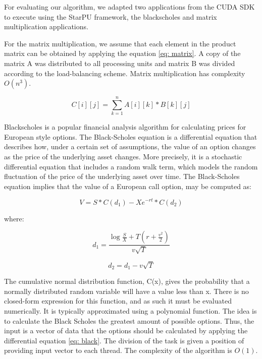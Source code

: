 \documentclass[journal]{IEEEtran}
\begin{document}
For evaluating our algorithm, we adapted two applications from the CUDA
SDK~\cite{cuda} to execute using the StarPU framework, the blackscholes and matrix
multiplication applications.

For the matrix multiplication, we assume that each element in the product matrix
can be obtained by applying the equation \ref{eq: matrix}. A copy of the matrix
A was distributed to all processing units and matrix B was divided according to
the load-balancing scheme. Matrix multiplication has complexity $O(n^3)$.

\begin{equation}
 C[i][j] = \sum_{k=1}^{n}  A[i][k] * B[k][j]
  \label{eq: matrix}
\end {equation}

Blackscholes is a popular financial analysis algorithm for calculating prices
for European style options. The Black-Scholes equation is a differential
equation that describes how, under a certain set of assumptions, the value of an
option changes as the price of the underlying asset changes. More precisely, it
is a stochastic differential equation that includes a random walk term, which
models the random fluctuation of the price of the underlying asset over time.
The Black-Scholes equation implies that the value of a European call option, 
may be computed as:


\begin{equation}
 V = S * C(d_1) - Xe^{-rt} * C(d_2)
  \label{eq: black}
\end {equation}

where:

\begin{equation}
 d_1 = \frac {\log {\frac{S}{X}} + T(r + \frac{v^2}{2})}{ v\sqrt{T}}
  \label{eq: blackD1}
\end {equation}

\begin{equation}
 d_2 =d_1 - v\sqrt{T}
  \label{eq: blackD2}
\end {equation}

The cumulative normal distribution function, C(x), gives the probability that a
normally distributed random variable will have a value less than x. There is no
closed-form expression for this function, and as such it must be evaluated
numerically. It is typically approximated using a polynomial function. The idea is to calculate the Black Scholes the greatest amount of possible options. Thus, the input is a vector of data that the options should be calculated by applying the differential equation \ref{eq: black}. The division of the task is given a position of providing input vector to each thread. The complexity of the algorithm is $O(1)$.
\end{document}
